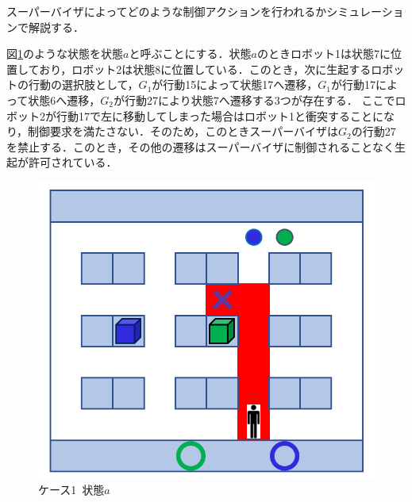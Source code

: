 スーパーバイザによってどのような制御アクションを行われるかシミュレーションで解説する．

図\ref{fig:HITL1_case1_a}のような状態を状態$a$と呼ぶことにする．状態$a$のときロボット1は状態7に位置しており，ロボット2は状態8に位置している．このとき，次に生起するロボットの行動の選択肢として，$G_1$が行動15によって状態17へ遷移，$G_1$が行動17によって状態6へ遷移，$G_2$が行動27により状態7へ遷移する3つが存在する．
ここでロボット2が行動17で左に移動してしまった場合はロボット1と衝突することになり，制御要求を満たさない．そのため，このときスーパーバイザは$G_2$の行動27を禁止する．このとき，その他の遷移はスーパーバイザに制御されることなく生起が許可されている．

\begin{figure}[!t]
    \centering
    \includegraphics[scale=0.3]{figures/HITL1_case1_a.png}
    \caption{ケース1\ 状態$a$}
    \label{fig:HITL1_case1_a}
\end{figure}

